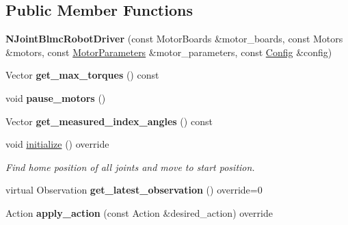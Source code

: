 \subsection*{Public Member Functions}
\begin{DoxyCompactItemize}
\item 
\mbox{\label{classblmc__robots_1_1NJointBlmcRobotDriver_acc2af471c4db682f57854d14430ef3fa}} 
{\bfseries N\+Joint\+Blmc\+Robot\+Driver} (const Motor\+Boards \&motor\+\_\+boards, const Motors \&motors, const \hyperlink{structblmc__robots_1_1MotorParameters}{Motor\+Parameters} \&motor\+\_\+parameters, const \hyperlink{structblmc__robots_1_1NJointBlmcRobotDriver_1_1Config}{Config} \&config)
\item 
\mbox{\label{classblmc__robots_1_1NJointBlmcRobotDriver_a8bfdae3670c639a7dc129e17687b0285}} 
Vector {\bfseries get\+\_\+max\+\_\+torques} () const
\item 
\mbox{\label{classblmc__robots_1_1NJointBlmcRobotDriver_a9ac3d22be40ce2c6f8bafd901bdb4a3d}} 
void {\bfseries pause\+\_\+motors} ()
\item 
\mbox{\label{classblmc__robots_1_1NJointBlmcRobotDriver_a274d4d97156b77e6f2dcfda74d67e45c}} 
Vector {\bfseries get\+\_\+measured\+\_\+index\+\_\+angles} () const
\item 
void \hyperlink{classblmc__robots_1_1NJointBlmcRobotDriver_a7a1ece2b5d4f0f607a4d0516543b0d48}{initialize} () override
\begin{DoxyCompactList}\small\item\em Find home position of all joints and move to start position. \end{DoxyCompactList}\item 
\mbox{\label{classblmc__robots_1_1NJointBlmcRobotDriver_abc4c63313e05020b91dad26a580e184f}} 
virtual Observation {\bfseries get\+\_\+latest\+\_\+observation} () override=0
\item 
\mbox{\label{classblmc__robots_1_1NJointBlmcRobotDriver_a200a5a050a1e2d493f47dc1228319d27}} 
Action {\bfseries apply\+\_\+action} (const Action \&desired\+\_\+action) override

\end{DoxyCompactItemize}

